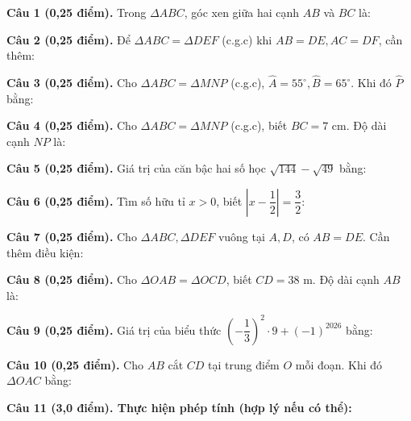 \documentclass[12pt,a4paper]{article}
\begin{document}
\vspace{1.2mm}
\noindent\textbf{Câu 1 (0,25 điểm).} Trong $\Delta ABC$, góc xen giữa hai cạnh $AB$ và $BC$ là: \par\vspace{2.2mm}
\noindent\textbf{Câu 2 (0,25 điểm).} Để $\Delta ABC = \Delta DEF$ (c.g.c) khi $AB=DE, AC=DF$, cần thêm: \par\vspace{2.2mm}
\noindent\textbf{Câu 3 (0,25 điểm).} Cho $\Delta ABC = \Delta MNP$ (c.g.c), $\widehat{A}=55^\circ, \widehat{B}=65^\circ$. Khi đó $\widehat{P}$ bằng: \par\vspace{2.2mm}
\noindent\textbf{Câu 4 (0,25 điểm).} Cho $\Delta ABC = \Delta MNP$ (c.g.c), biết $BC = 7\text{ cm}$. Độ dài cạnh $NP$ là: \par\vspace{2.2mm}
\noindent\textbf{Câu 5 (0,25 điểm).} Giá trị của căn bậc hai số học $\sqrt{144} - \sqrt{49}$ bằng: \par\vspace{2.2mm}
\noindent\textbf{Câu 6 (0,25 điểm).} Tìm số hữu tỉ $x > 0$, biết $\left|x - \dfrac{1}{2}\right| = \dfrac{3}{2}$: \par\vspace{2.2mm}
\noindent\textbf{Câu 7 (0,25 điểm).} Cho $\Delta ABC, \Delta DEF$ vuông tại $A, D$, có $AB=DE$. Cần thêm điều kiện: \par\vspace{2.2mm}
\noindent\textbf{Câu 8 (0,25 điểm).} Cho $\Delta OAB = \Delta OCD$, biết $CD = 38\text{ m}$. Độ dài cạnh $AB$ là: \par\vspace{2.2mm}
\noindent\textbf{Câu 9 (0,25 điểm).} Giá trị của biểu thức $\left(-\dfrac{1}{3}\right)^2 \cdot 9 + (-1)^{2026}$ bằng: \par\vspace{2.2mm}
\noindent\textbf{Câu 10 (0,25 điểm).} Cho $AB$ cắt $CD$ tại trung điểm $O$ mỗi đoạn. Khi đó $\Delta OAC$ bằng: \par\vspace{2.2mm}
\vspace{0.2mm}
\noindent\textbf{Câu 11 (3,0 điểm). Thực hiện phép tính (hợp lý nếu có thể):}
\vspace{0.6mm}
\end{document}
